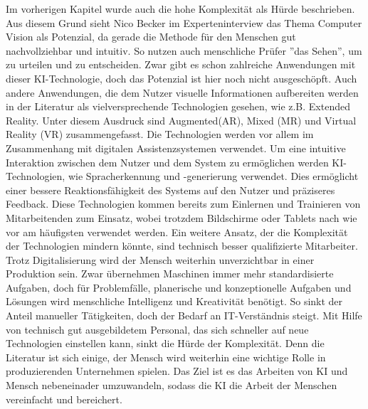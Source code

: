 \documentclass[a4paper,12pt, german]{report}
\begin{document}
Im vorherigen Kapitel wurde auch die hohe Komplexität als Hürde beschrieben. Aus diesem Grund sieht Nico Becker im Experteninterview das Thema Computer Vision als Potenzial, da gerade die Methode für den Menschen gut nachvollziehbar und intuitiv. So nutzen auch menschliche Prüfer ''das Sehen'', um zu urteilen und zu entscheiden. Zwar gibt es schon zahlreiche Anwendungen mit dieser KI-Technologie, doch das Potenzial ist hier noch nicht ausgeschöpft. \newline Auch andere Anwendungen, die dem Nutzer visuelle Informationen aufbereiten werden in der Literatur als vielversprechende Technologien gesehen, wie z.B. Extended Reality. Unter diesem Ausdruck sind Augmented(AR), Mixed (MR) und Virtual Reality (VR) zusammengefasst. Die Technologien werden vor allem im Zusammenhang mit digitalen Assistenzsystemen verwendet. Um eine intuitive Interaktion zwischen dem Nutzer und dem System zu ermöglichen werden KI-Technologien, wie Spracherkennung und -generierung verwendet. Dies ermöglicht einer bessere Reaktionsfähigkeit des Systems auf den Nutzer und präziseres Feedback. Diese Technologien kommen bereits zum Einlernen und Trainieren von Mitarbeitenden zum Einsatz, wobei trotzdem Bildschirme oder Tablets nach wie vor am häufigsten verwendet werden.\cite{37} \newline
Ein weitere Ansatz, der die Komplexität der Technologien mindern könnte, sind technisch besser qualifizierte Mitarbeiter. Trotz Digitalisierung wird der Mensch weiterhin unverzichtbar in einer Produktion sein. Zwar übernehmen Maschinen immer mehr standardisierte Aufgaben, doch für Problemfälle, planerische und konzeptionelle Aufgaben und Lösungen wird menschliche Intelligenz und Kreativität benötigt. So sinkt der Anteil manueller Tätigkeiten, doch der Bedarf an IT-Verständnis steigt.\cite{36} Mit Hilfe von technisch gut ausgebildetem Personal, das sich schneller auf neue Technologien einstellen kann, sinkt die Hürde der Komplexität. Denn die Literatur ist sich einige, der Mensch wird weiterhin eine wichtige Rolle in produzierenden Unternehmen spielen. Das Ziel ist es das Arbeiten von KI und Mensch nebeneinader umzuwandeln, sodass die KI die Arbeit der Menschen vereinfacht und bereichert.\cite{02}
\end{document}
